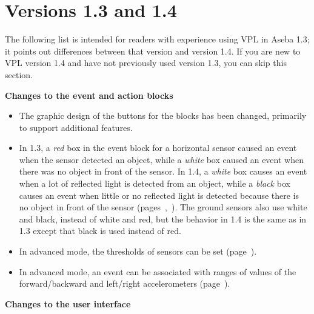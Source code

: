\chapter*{Versions 1.3 and 1.4}

The following list is intended for readers with experience using VPL in
Aseba 1.3; it points out differences between that version and version
1.4. If you are new to VPL version 1.4 and have not previously used
version 1.3, you can skip this section.

\textbf{Changes to the event and action blocks}

\begin{itemize}

\item The graphic design of the buttons for the blocks has been changed,
primarily to support additional features.

\item In 1.3, a \emph{red} box in the event block for a horizontal
sensor caused an event when the sensor detected an object, while a
\emph{white} box caused an event when there was no object in front of
the sensor. In 1.4, a \emph{white} box causes an event when a lot of
reflected light is detected from an object, while a \emph{black} box
causes an event when little or no reflected light is detected because
there is no object in front of the sensor
(pages~\pageref{p.proximity-colors1},~\pageref{p.proximity-colors2}).
The ground sensors also use white and black, instead of white and red,
but the behavior in 1.4 is the same as in 1.3 except that black is used
instead of red.


\item In advanced mode, the thresholds of sensors can be
set (page~\pageref{p.proximity-sensitivity}).

\item In advanced mode, an event can be associated with ranges of values
of the forward/backward and left/right accelerometers
(page~\pageref{p.accel}).


\end{itemize}

\textbf{Changes to the user interface}

